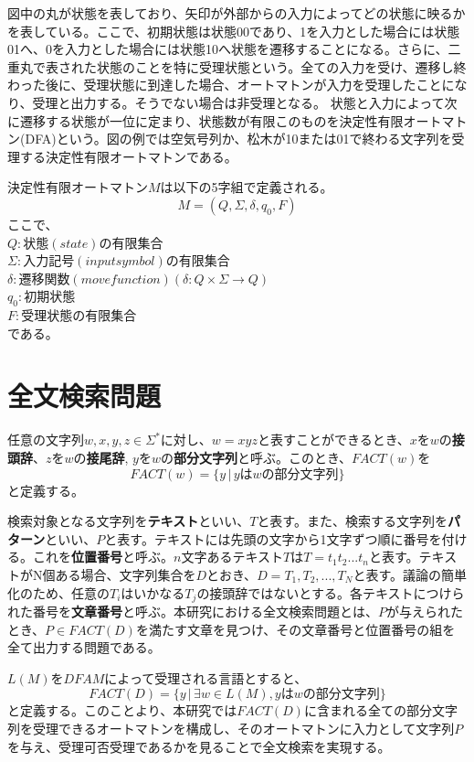 \documentclass[11pt,a4paper]{jreport}
\begin{document}
  図中の丸が状態を表しており、矢印が外部からの入力によってどの状態に映るかを表している。ここで、初期状態は状態00であり、1を入力とした場合には状態01へ、0を入力とした場合には状態10へ状態を遷移することになる。さらに、二重丸で表された状態のことを特に受理状態という。全ての入力を受け、遷移し終わった後に、受理状態に到達した場合、オートマトンが入力を受理したことになり、受理と出力する。そうでない場合は非受理となる。
  状態と入力によって次に遷移する状態が一位に定まり、状態数が有限このものを決定性有限オートマトン(DFA)という。図の例では空気号列か、松木が10または01で終わる文字列を受理する決定性有限オートマトンである。

  決定性有限オートマトン$M$は以下の5字組で定義される。
  $$
    M = (Q, \Sigma, \delta, q_0, F)
  $$
  ここで、\\
  $Q: 状態(state)の有限集合$\\
  $\Sigma: 入力記号(input symbol)の有限集合$\\
  $\delta: 遷移関数(move function) (\delta: Q \times \Sigma \rightarrow Q)$\\
  $q_0: 初期状態$\\
  $F: 受理状態の有限集合$\\である。

  \section{全文検索問題}
  任意の文字列$w, x, y, z \in \Sigma^*$に対し、$w = xyz$と表すことができるとき、$xをw$の\textbf{接頭辞}、$zをw$の\textbf{接尾辞}, $yをw$の\textbf{部分文字列}と呼ぶ。このとき、$FACT(w)$を$$FACT(w) = \{ y\,|\,yはwの部分文字列\}$$と定義する。

  検索対象となる文字列を\textbf{テキスト}といい、$T$と表す。また、検索する文字列を\textbf{パターン}といい、$P$と表す。テキストには先頭の文字から1文字ずつ順に番号を付ける。これを\textbf{位置番号}と呼ぶ。$n$文字あるテキスト$T$は$T=t_1t_2...t_n$と表す。テキストがN個ある場合、文字列集合を$D$とおき、$D={T_1, T_2,..., T_N}$と表す。議論の簡単化のため、$任意のT_iはいかなるT_j$の接頭辞ではないとする。各テキストにつけられた番号を\textbf{文章番号}と呼ぶ。本研究における全文検索問題とは、$P$が与えられたとき、$P \in FACT(D)$を満たす文章を見つけ、その文章番号と位置番号の組を全て出力する問題である。

  $L(M)をDFA M$によって受理される言語とすると、$$FACT(D) = \{y\,|\,\exists w \in L(M), yはwの部分文字列\}$$と定義する。このことより、本研究では$FACT(D)$に含まれる全ての部分文字列を受理できるオートマトンを構成し、そのオートマトンに入力として文字列$P$を与え、受理可否受理であるかを見ることで全文検索を実現する。
\end{document}
